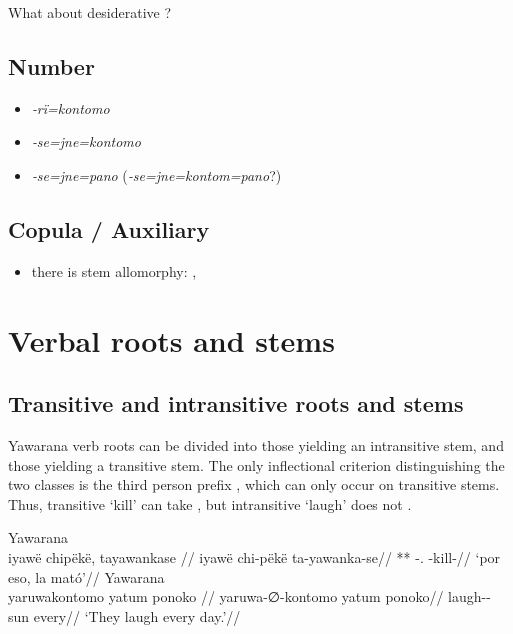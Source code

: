 \documentclass{memoir}
\begin{document}
What about desiderative ?

\section{Number}

\begin{itemize}
\tightlist
\item
  \emph{‑rï=kontomo}
\item
  \emph{‑se=jne=kontomo}
\item
  \emph{‑se=jne=pano} (\emph{‑se=jne=kontom=pano}?)
\end{itemize}

\section{Copula / Auxiliary}

\begin{itemize}
\tightlist
\item
  there is stem allomorphy: , 
\end{itemize}

\chapter{\texorpdfstring{Verbal roots and stems
\label{verbderiv}}{Verbal roots and stems }}

\section{\texorpdfstring{Transitive and intransitive roots and stems
\label{sec:verbroots}}{Transitive and intransitive roots and stems }}

Yawarana verb roots can be divided into those yielding an intransitive
stem, and those yielding a transitive stem. The only inflectional
criterion distinguishing the two classes is the third person prefix
, which can only occur on transitive stems. Thus, transitive
 `kill' can take  , but
intransitive  `laugh' does not .

\pex\label{}    \a Yawarana\\
    \label{convfemgrme-217}        \begingl
        \glpreamble  iyawë chipëkë, tayawankase //
        \gla iyawë chi-pëkë ta-yawanka-se//
        \glb *** -. -kill-//
            \glft ‘por eso, la mató’//  
        \endgl 
    \a Yawarana\\
    \label{convrisamaj-42}        \begingl
        \glpreamble  yaruwakontomo yatum ponoko //
        \gla yaruwa-∅-kontomo yatum ponoko//
        \glb laugh-- sun every//
            \glft ‘They laugh every day.’//  
        \endgl 
\xe
\end{document}
